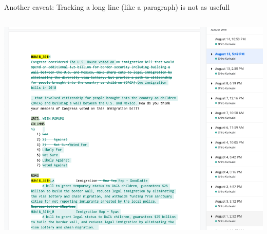 \documentclass[ignorenonframetext, 10pt, aspectratio=169]{beamer}
\begin{document}
\begin{frame}{Another caveat: Tracking a long line (like a paragraph) is not as usefull}
\begin{columns}[T]
\begin{column}{0.6\textwidth}
\begin{overprint}
\includegraphics[width = \linewidth]{googledoc-diff.png}
\end{overprint}
\end{column}
\end{columns}
\end{frame}
\end{document}
